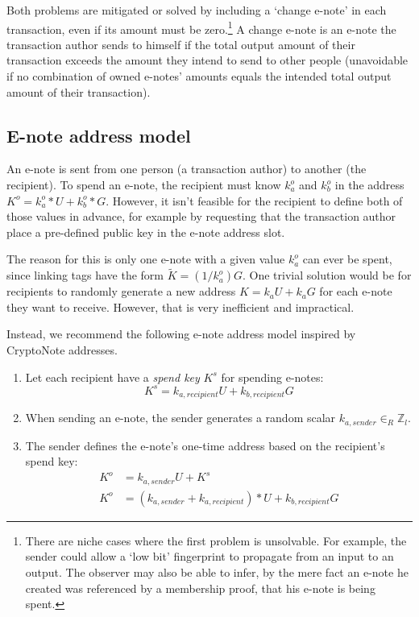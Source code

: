 Both problems are mitigated or solved by including a `change e-note' in each transaction, even if its amount must be zero.\footnote{There are niche cases where the first problem is unsolvable. For example, the sender could allow a `low bit' fingerprint to propagate from an input to an output. The observer may also be able to infer, by the mere fact an e-note he created was referenced by a membership proof, that his e-note is being spent.} A change e-note is an e-note the transaction author sends to himself if the total output amount of their transaction exceeds the amount they intend to send to other people (unavoidable if no combination of owned e-notes' amounts equals the intended total output amount of their transaction).


\subsection{E-note address model}
\label{subsec:seraphis-address-model}

An e-note is sent from one person (a transaction author) to another (the recipient). To spend an e-note, the recipient must know $k^o_a$ and $k^o_b$ in the address $K^o = k^o_a*U + k^o_b*G$. However, it isn't feasible for the recipient to define both of those values in advance, for example by requesting that the transaction author place a pre-defined public key in the e-note address slot.

The reason for this is only one e-note with a given value $k^o_a$ can ever be spent, since linking tags have the form $\tilde{K} = (1/k^o_a) G$. One trivial solution would be for recipients to randomly generate a new address $K = k_a U + k_a G$ for each e-note they want to receive. However, that is very inefficient and impractical.

Instead, we recommend the following e-note address model inspired by CryptoNote addresses.

\begin{enumerate}
    \item Let each recipient have a {\em spend key} $K^s$ for spending e-notes:\vspace{.115cm}
    \[K^s = k_{a, recipient} U + k_{b, recipient} G\]

    \item When sending an e-note, the sender generates a random scalar $k_{a, sender} \in_R \mathbb{Z}_l$.

    \item The sender defines the e-note's one-time address based on the recipient's spend key:\vspace{.115cm}
    \begin{align*}
        K^o &= k_{a, sender} U + K^s \\
        K^o &= (k_{a, sender} + k_{a, recipient})*U + k_{b, recipient} G
    \end{align*}
\end{enumerate}

